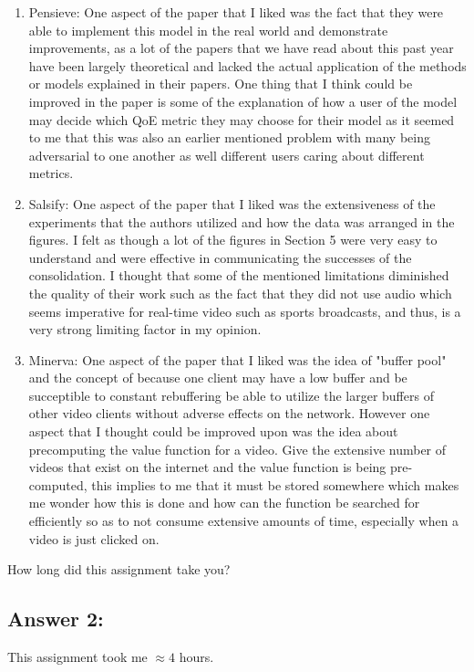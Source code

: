 \documentclass[10pt]{article}
\newenvironment{problem}[2][Problem]{\begin{trivlist}
\item[\hskip \labelsep {\bfseries #1}\hskip \labelsep {\bfseries #2.}]}{\end{trivlist}}
\begin{document}
\begin{enumerate}
\begin{enumerate}
        \item Pensieve: One aspect of the paper that I liked was the fact that they were able to implement this model in the real world and demonstrate improvements, as a lot of the papers that we have read about this past year have been largely theoretical and lacked the actual application of the methods or models explained in their papers. One thing that I think could be improved in the paper is some of the explanation of how a user of the model may decide which QoE metric they may choose for their model as it seemed to me that this was also an earlier mentioned problem with many being adversarial to one another as well different users caring about different metrics.
        \item Salsify: One aspect of the paper that I liked was the extensiveness of the experiments that the authors utilized and how the data was arranged in the figures. I felt as though a lot of the figures in Section 5 were very easy to understand and were effective in communicating the successes of the consolidation. I thought that some of the mentioned limitations diminished the quality of their work such as the fact that they did not use audio which seems imperative for real-time video such as sports broadcasts, and thus, is a very strong limiting factor in my opinion.
        \item Minerva: One aspect of the paper that I liked was the idea of "buffer pool" and the concept of because one client may have a low buffer and be succeptible to constant rebuffering be able to utilize the larger buffers of other video clients without adverse effects on the network. However one aspect that I thought could be improved upon was the idea about precomputing the value function for a video. Give the extensive number of videos that exist on the internet and the value function is being pre-computed, this implies to me that it must be stored somewhere which makes me wonder how this is done and how can the function be searched for efficiently so as to not consume extensive amounts of time, especially when a video is just clicked on.
    \end{enumerate}
\end{enumerate}


\begin{problem}{2}
How long did this assignment take you?
\end{problem}
\subsection*{Answer 2:}
This assignment took me $\approx 4$ hours.
\end{document}
